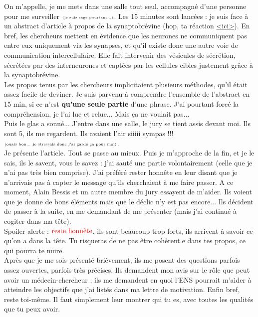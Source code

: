 \lettrine{{\color{yellow!80!black} \oldpilcrowfive}}{}
On m'appelle, je me mets dans une salle tout seul, accompagné d'une personne pour me surveiller $\tiny\text{(je suis sage pourtant...)}$. Les 15 minutes sont lancées : je suis face à un abstract d'article à propos de la synaptobrévine (hop, ta réaction \href{https://www.youtube.com/watch?v=6elK8VI1rPs}{<ici>}). En bref, les chercheurs mettent en évidence que les neurones ne communiquent pas entre eux uniquement via les synapses, et qu'il existe donc une autre voie de communication intercellulaire. Elle fait intervenir des vésicules de sécrétion, sécrétées par des interneurones et captées par les cellules cibles justement grâce à la synaptobrévine.\\
Les propos tenus par les chercheurs implicitaient plusieurs méthodes, qu'il était assez facile de deviner. Je suis parvenu à comprendre l'ensemble de l'abstract en 15 min, si ce n'est \textbf{qu'une seule partie} d'une phrase. J'ai pourtant forcé la compréhension, je l'ai lue et relue... Mais ça ne voulait pas...\\
Puis le glas a sonné... J'entre dans une salle, le jury se tient assis devant moi. Ils sont 5, ils me regardent. Ils avaient l'air siiiii sympas !!! $\tiny\text{(ouais bon... je stressais donc j'ai gardé ça pour moi)}$.\\
Je présente l'article. Tout se passe au mieux. Puis je m'approche de la fin, et je le sais, ils le savent, vous le savez : j'ai sauté une partie volontairement (celle que je n'ai pas très bien comprise). J'ai préféré rester honnête en leur disant que je n'arrivais pas à capter le message qu'ils cherchaient à me faire passer. A ce moment, Alain Bessis et un autre membre du jury essayent de m'aider. Ils voient que je donne de bons éléments mais que le déclic n'y est pas encore... Ils décident de passer à la suite, en me demandant de me présenter (mais j'ai continué à cogiter dans ma tête).\\
Spoiler alerte : $\textcolor{red}{\text{reste honnête}}$, ils sont beaucoup trop forts, ils arrivent à savoir ce qu'on a dans la tête. Tu risqueras de ne pas être cohérent.e dans tes propos, ce qui pourra te nuire.\\
Après que je me sois présenté brièvement, ils me posent des questions parfois assez ouvertes, parfois très précises. Ils demandent mon avis sur le rôle que peut avoir un médecin-chercheur ; ils me demandent en quoi l'ENS pourrait m'aider à atteindre les objectifs que j'ai listés dans ma lettre de motivation. Enfin bref, reste toi-même. Il faut simplement leur montrer qui tu es, avec toutes les qualités que tu peux avoir.\\
